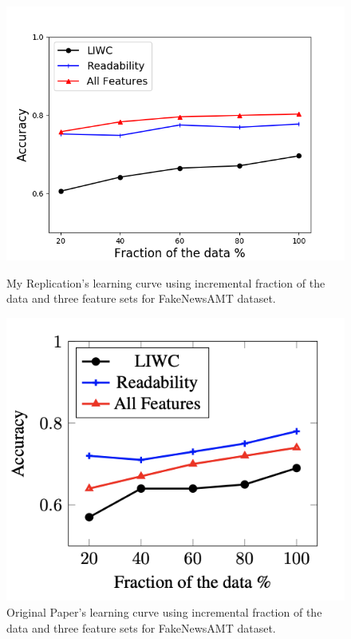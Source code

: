 \documentclass{article}
\begin{document}
\begin{figure}[]
  \centering
  \begin{minipage}[b]{0.4\textwidth}
    \includegraphics[width=\textwidth]{Results_For_Paper/Figure1a-me.png}
    \caption{My Replication's learning curve using incremental fraction of the data and three feature sets for FakeNewsAMT dataset.}
  \end{minipage}
  \hfill
  \begin{minipage}[b]{0.4\textwidth}
    \includegraphics[width=\textwidth]{Results_For_Paper/Figure1a-real.png}
    \caption{Original Paper's learning curve using incremental fraction of the data and three feature sets for FakeNewsAMT dataset.}
  \end{minipage}
\end{figure}
\end{document}

